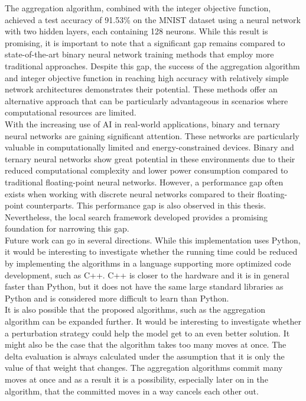 \noindent The aggregation algorithm, combined with the integer objective function, achieved a test accuracy of 91.53\% on the MNIST dataset using a neural network with two hidden layers, each containing 128 neurons. While this result is promising, it is important to note that a significant gap remains compared to state-of-the-art binary neural network training methods that employ more traditional approaches. Despite this gap, the success of the aggregation algorithm and integer objective function in reaching high accuracy with relatively simple network architectures demonstrates their potential. These methods offer an alternative approach that can be particularly advantageous in scenarios where computational resources are limited. \\

\noindent With the increasing use of AI in real-world applications, binary and ternary neural networks are gaining significant attention. These networks are particularly valuable in computationally limited and energy-constrained devices. Binary and ternary neural networks show great potential in these environments due to their reduced computational complexity and lower power consumption compared to traditional floating-point neural networks. However, a performance gap often exists when working with discrete neural networks compared to their floating-point counterparts. This performance gap is also observed in this thesis. Nevertheless, the local search framework developed provides a promising foundation for narrowing this gap. \\

\noindent Future work can go in several directions. While this implementation uses Python, it would be interesting to investigate whether the running time could be reduced by implementing the algorithms in a language supporting more optimized code development, such as C++. C++ is closer to the hardware and it is in general faster than Python, but it does not have the same large standard libraries as Python and is considered more difficult to learn than Python. \\

\noindent It is also possible that the proposed algorithms, such as the aggregation algorithm can be expanded further. It would be interesting to investigate whether a perturbation strategy could help the model get to an even better solution. It might also be the case that the algorithm takes too many moves at once. The delta evaluation is always calculated under the assumption that it is only the value of that weight that changes. The aggregation algorithms commit many moves at once and as a result it is a possibility, especially later on in the algorithm, that the committed moves in a way cancels each other out. \\


